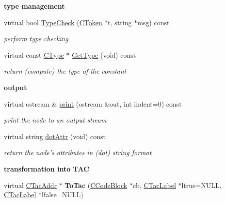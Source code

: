 \begin{Indent}{\bf type management}\par
\begin{DoxyCompactItemize}
\item 
virtual bool \hyperlink{classCAstConstant_a7dcf1fb0ef2da84dcca29a15ff799f6b}{Type\-Check} (\hyperlink{classCToken}{C\-Token} $\ast$t, string $\ast$msg) const 
\begin{DoxyCompactList}\small\item\em perform type checking \end{DoxyCompactList}\item 
\hypertarget{classCAstConstant_aab386319a2ce8920b3cb4879fad928fb}{virtual const \hyperlink{classCType}{C\-Type} $\ast$ \hyperlink{classCAstConstant_aab386319a2ce8920b3cb4879fad928fb}{Get\-Type} (void) const }\label{classCAstConstant_aab386319a2ce8920b3cb4879fad928fb}

\begin{DoxyCompactList}\small\item\em return (compute) the type of the constant \end{DoxyCompactList}\end{DoxyCompactItemize}
\end{Indent}
\begin{Indent}{\bf output}\par
\begin{DoxyCompactItemize}
\item 
virtual ostream \& \hyperlink{classCAstConstant_aed3e2c194ca61b7949291fd4e531434e}{print} (ostream \&out, int indent=0) const 
\begin{DoxyCompactList}\small\item\em print the node to an output stream \end{DoxyCompactList}\item 
virtual string \hyperlink{classCAstConstant_a8a8cf480d6949e9f063394487f71f7fa}{dot\-Attr} (void) const 
\begin{DoxyCompactList}\small\item\em return the node's attributes in (dot) string format \end{DoxyCompactList}\end{DoxyCompactItemize}
\end{Indent}
\begin{Indent}{\bf transformation into T\-A\-C}\par
\begin{DoxyCompactItemize}
\item 
\hypertarget{classCAstConstant_a1bd80fbda81a04d8f1e85983aad16cd5}{virtual \hyperlink{classCTacAddr}{C\-Tac\-Addr} $\ast$ {\bfseries To\-Tac} (\hyperlink{classCCodeBlock}{C\-Code\-Block} $\ast$cb, \hyperlink{classCTacLabel}{C\-Tac\-Label} $\ast$ltrue=N\-U\-L\-L, \hyperlink{classCTacLabel}{C\-Tac\-Label} $\ast$lfalse=N\-U\-L\-L)}\label{classCAstConstant_a1bd80fbda81a04d8f1e85983aad16cd5}

\end{DoxyCompactItemize}
\end{Indent}
